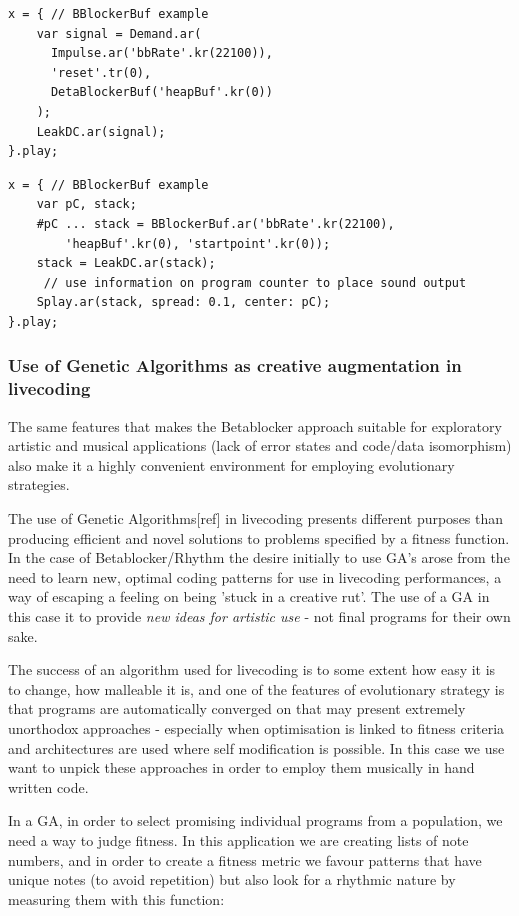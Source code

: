 \documentclass[letterpaper, 12pt]{article}
\begin{document}
\begin{Verbatim}[fontfamily=courier, xleftmargin=\parindent]
x = { // BBlockerBuf example
	var signal = Demand.ar(
	  Impulse.ar('bbRate'.kr(22100)), 
	  'reset'.tr(0),
	  DetaBlockerBuf('heapBuf'.kr(0))
	);
	LeakDC.ar(signal);
}.play;
\end{Verbatim}

\begin{Verbatim}[fontfamily=courier, xleftmargin=\parindent]
x = { // BBlockerBuf example
	var pC, stack;
	#pC ... stack = BBlockerBuf.ar('bbRate'.kr(22100), 
		'heapBuf'.kr(0), 'startpoint'.kr(0));
	stack = LeakDC.ar(stack);
	 // use information on program counter to place sound output
	Splay.ar(stack, spread: 0.1, center: pC);
}.play;
\end{Verbatim}


\subsubsection{Use of Genetic Algorithms as creative augmentation in livecoding} %
\label{sub:genetic_programming}

The same features that makes the Betablocker approach suitable for exploratory artistic and musical applications (lack of error states and code/data isomorphism) also make it a highly convenient environment for employing evolutionary strategies.

The use of Genetic Algorithms[ref] in livecoding presents different purposes than producing efficient and novel solutions to problems specified by a fitness function. In the case of Betablocker/Rhythm the desire initially to use GA's arose from the need to learn new, optimal coding patterns for use in livecoding performances, a way of escaping a feeling on being 'stuck in a creative rut'. The use of a GA in this case it to provide \emph{new ideas for artistic use} - not final programs for their own sake.

The success of an algorithm used for livecoding is to some extent how easy it is to change, how malleable it is, and one of the features of evolutionary strategy is that programs are automatically converged on that may present extremely unorthodox approaches - especially when optimisation is linked to fitness criteria and architectures are used where self modification is possible. In this case we use want to unpick these approaches in order to employ them musically in hand written code.

In a GA, in order to select promising individual programs from a population, we need a way to judge fitness. In this application we are creating lists of note numbers, and in order to create a fitness metric we favour patterns that have unique notes (to avoid repetition) but also look for a rhythmic nature by measuring them with this function:
\end{document}
